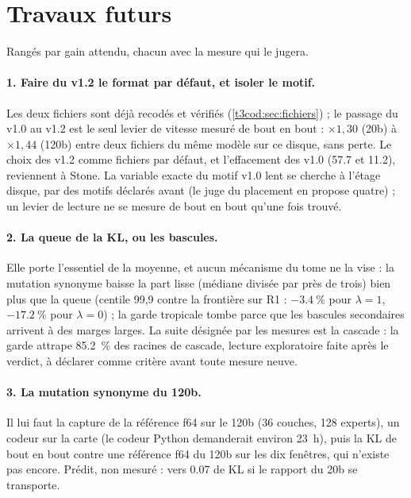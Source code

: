 \section{Travaux futurs}\label{t3dis:sec:futurs}

Rangés par gain attendu, chacun avec la mesure qui le jugera.

\paragraph{1. Faire du v1.2 le format par défaut, et isoler le motif.} Les deux fichiers sont déjà recodés et vérifiés (\cref{t3cod:sec:fichiers}) ; le passage du v1.0 au v1.2 est le seul levier de vitesse mesuré de bout en bout : $\times 1{,}30$ (20b) à $\times 1{,}44$ (120b) entre deux fichiers du même modèle sur ce disque, sans perte. Le choix des v1.2 comme fichiers par défaut, et l'effacement des v1.0 (\SI{57.7}{\Go} et \SI{11.2}{\Go}), reviennent à Stone. La variable exacte du motif v1.0 lent se cherche à l'étage disque, par des motifs déclarés avant (le juge du placement en propose quatre) ; un levier de lecture ne se mesure de bout en bout qu'une fois trouvé.

\paragraph{2. La queue de la KL, ou les bascules.} Elle porte l'essentiel de la moyenne, et aucun mécanisme du tome ne la vise : la mutation synonyme baisse la part lisse (médiane divisée par près de trois) bien plus que la queue (centile 99,9 contre la frontière sur R1 : $-\SI{3.4}{\percent}$ pour $\lambda = 1$, $-\SI{17.2}{\percent}$ pour $\lambda = 0$) ; la garde tropicale tombe parce que les bascules secondaires arrivent à des marges larges. La suite désignée par les mesures est la cascade : la garde attrape \SI{85.2}{\percent} des racines de cascade, lecture exploratoire faite après le verdict, à déclarer comme critère avant toute mesure neuve.

\paragraph{3. La mutation synonyme du 120b.} Il lui faut la capture de la référence f64 sur le 120b (36 couches, 128 experts), un codeur sur la carte (le codeur Python demanderait environ \SI{23}{\hour}), puis la KL de bout en bout contre une référence f64 du 120b sur les dix fenêtres, qui n'existe pas encore. Prédit, non mesuré : vers \num{0.07} de KL si le rapport du 20b se transporte.


